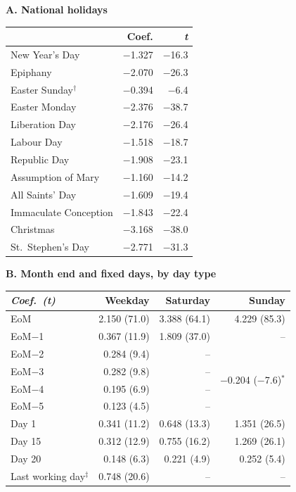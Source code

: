 \documentclass[10pt]{article}
\newcommand{\m}{$-$}
\begin{document}
\small
\noindent
\begin{minipage}[t]{0.37\textwidth}
\textbf{A. National holidays}\\[3pt]
\begin{tabular*}{\linewidth}{@{\extracolsep{\fill}}l r r@{}}
\toprule
 & Coef. & \textit{t} \\
\midrule
New Year's Day        & \m1.327 & \m16.3 \\
Epiphany              & \m2.070 & \m26.3 \\
Easter Sunday$^{\dagger}$ & \m0.394 & \m6.4 \\
Easter Monday         & \m2.376 & \m38.7 \\
Liberation Day        & \m2.176 & \m26.4 \\
Labour Day            & \m1.518 & \m18.7 \\
Republic Day          & \m1.908 & \m23.1 \\
Assumption of Mary    & \m1.160 & \m14.2 \\
All Saints' Day       & \m1.609 & \m19.4 \\
Immaculate Conception & \m1.843 & \m22.4 \\
Christmas             & \m3.168 & \m38.0 \\
St.\ Stephen's Day    & \m2.771 & \m31.3 \\
\bottomrule
\end{tabular*}
\end{minipage}%
\hfill
\begin{minipage}[t]{0.585\textwidth}
\textbf{B. Month end and fixed days, by day type}\\[3pt]
\begin{tabular*}{\linewidth}{@{\extracolsep{\fill}}l r r r@{}}
\toprule
\textit{Coef.\ (t)} & Weekday & Saturday & Sunday \\
\midrule
EoM                 & 2.150 (71.0) & 3.388 (64.1) & 4.229 (85.3) \\
EoM\m1              & 0.367 (11.9) & 1.809 (37.0) & -- \\
EoM\m2              & 0.284 (9.4) & -- & \multirow{4}{*}{\m0.204 (\m7.6)$^{*}$} \\
EoM\m3              & 0.282 (9.8) & -- & \\
EoM\m4              & 0.195 (6.9) & -- & \\
EoM\m5              & 0.123 (4.5) & -- & \\
\addlinespace[2pt]
Day 1               & 0.341 (11.2) & 0.648 (13.3) & 1.351 (26.5) \\
Day 15              & 0.312 (12.9) & 0.755 (16.2) & 1.269 (26.1) \\
Day 20              & 0.148 (6.3) & 0.221 (4.9) & 0.252 (5.4) \\
\addlinespace[2pt]
Last working day$^{\ddagger}$ & 0.748 (20.6) & -- & -- \\
\bottomrule
\end{tabular*}
\end{minipage}
\end{document}
